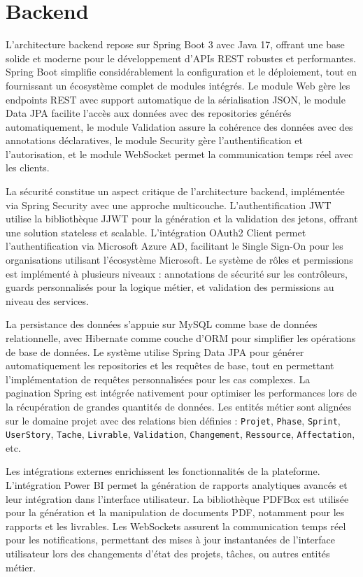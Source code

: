 \section{Backend}

L'architecture backend repose sur Spring Boot 3 \cite{pivotal2023} avec Java 17, offrant une base solide et moderne pour le développement d'APIs REST robustes et performantes. Spring Boot simplifie considérablement la configuration et le déploiement, tout en fournissant un écosystème complet de modules intégrés. Le module Web gère les endpoints REST avec support automatique de la sérialisation JSON, le module Data JPA facilite l'accès aux données avec des repositories générés automatiquement, le module Validation assure la cohérence des données avec des annotations déclaratives, le module Security gère l'authentification et l'autorisation, et le module WebSocket permet la communication temps réel avec les clients.

La sécurité constitue un aspect critique de l'architecture backend, implémentée via Spring Security avec une approche multicouche. L'authentification JWT utilise la bibliothèque JJWT pour la génération et la validation des jetons, offrant une solution stateless et scalable. L'intégration OAuth2 Client permet l'authentification via Microsoft Azure AD, facilitant le Single Sign-On pour les organisations utilisant l'écosystème Microsoft. Le système de rôles et permissions est implémenté à plusieurs niveaux : annotations de sécurité sur les contrôleurs, guards personnalisés pour la logique métier, et validation des permissions au niveau des services.

La persistance des données s'appuie sur MySQL \cite{microsoft2023} comme base de données relationnelle, avec Hibernate comme couche d'ORM pour simplifier les opérations de base de données. Le système utilise Spring Data JPA pour générer automatiquement les repositories et les requêtes de base, tout en permettant l'implémentation de requêtes personnalisées pour les cas complexes. La pagination Spring est intégrée nativement pour optimiser les performances lors de la récupération de grandes quantités de données. Les entités métier sont alignées sur le domaine projet avec des relations bien définies : \texttt{Projet}, \texttt{Phase}, \texttt{Sprint}, \texttt{UserStory}, \texttt{Tache}, \texttt{Livrable}, \texttt{Validation}, \texttt{Changement}, \texttt{Ressource}, \texttt{Affectation}, etc.

Les intégrations externes enrichissent les fonctionnalités de la plateforme. L'intégration Power BI permet la génération de rapports analytiques avancés et leur intégration dans l'interface utilisateur. La bibliothèque PDFBox est utilisée pour la génération et la manipulation de documents PDF, notamment pour les rapports et les livrables. Les WebSockets assurent la communication temps réel pour les notifications, permettant des mises à jour instantanées de l'interface utilisateur lors des changements d'état des projets, tâches, ou autres entités métier.

